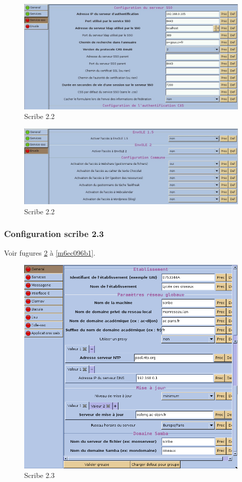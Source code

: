\documentclass{article}
\makeatletter
\def\maxwidth{\ifdim\Gin@nat@width>\linewidth\linewidth
\else\Gin@nat@width\fi}
\let\Oldincludegraphics\includegraphics
\renewcommand{\includegraphics}[1]{\Oldincludegraphics[width=\maxwidth]{#1}}
\makeatother
\begin{document}
\begin{figure}[htbp]
\centering
\includegraphics{scribe_html_m5ada8c94.jpg}
\caption{Scribe 2.2}
\end{figure}

\begin{figure}[htbp]
\centering
\includegraphics{scribe_html_m44b07c21.jpg}
\caption{Scribe 2.2 \label{m44b07c21}}
\end{figure}

\subsubsection{Configuration scribe 2.3}

Voir fugures \ref{5dc039bc} à \ref{m6ec096b1}.

\begin{figure}[htbp]
\centering
\includegraphics{scribe_html_5dc039bc.png}
\caption{Scribe 2.3 \label{5dc039bc}}
\end{figure}
\end{document}
